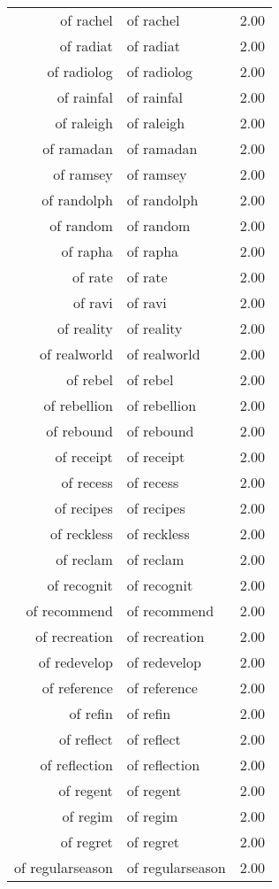 \begin{table}[ht]
\begin{tabular}{rlr}
  of rachel & of rachel & 2.00 \\ 
  of radiat & of radiat & 2.00 \\ 
  of radiolog & of radiolog & 2.00 \\ 
  of rainfal & of rainfal & 2.00 \\ 
  of raleigh & of raleigh & 2.00 \\ 
  of ramadan & of ramadan & 2.00 \\ 
  of ramsey & of ramsey & 2.00 \\ 
  of randolph & of randolph & 2.00 \\ 
  of random & of random & 2.00 \\ 
  of rapha & of rapha & 2.00 \\ 
  of rate & of rate & 2.00 \\ 
  of ravi & of ravi & 2.00 \\ 
  of reality & of reality & 2.00 \\ 
  of realworld & of realworld & 2.00 \\ 
  of rebel & of rebel & 2.00 \\ 
  of rebellion & of rebellion & 2.00 \\ 
  of rebound & of rebound & 2.00 \\ 
  of receipt & of receipt & 2.00 \\ 
  of recess & of recess & 2.00 \\ 
  of recipes & of recipes & 2.00 \\ 
  of reckless & of reckless & 2.00 \\ 
  of reclam & of reclam & 2.00 \\ 
  of recognit & of recognit & 2.00 \\ 
  of recommend & of recommend & 2.00 \\ 
  of recreation & of recreation & 2.00 \\ 
  of redevelop & of redevelop & 2.00 \\ 
  of reference & of reference & 2.00 \\ 
  of refin & of refin & 2.00 \\ 
  of reflect & of reflect & 2.00 \\ 
  of reflection & of reflection & 2.00 \\ 
  of regent & of regent & 2.00 \\ 
  of regim & of regim & 2.00 \\ 
  of regret & of regret & 2.00 \\ 
  of regularseason & of regularseason & 2.00 \\ 

\end{tabular}
\end{table}
